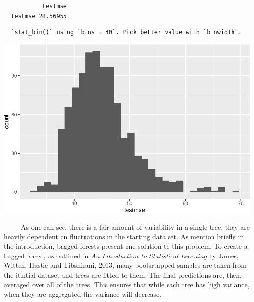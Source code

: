 \documentclass[12pt,twoside]{reedthesis}
\begin{document}
  \begin{verbatim}
           testmse
  testmse 28.56955
  \end{verbatim}
  
  \begin{Shaded}
  \begin{Highlighting}[]
  \NormalTok{(}\NormalTok{(}  \StringTok{ }\NormalTok{()}
  \end{Highlighting}
  \end{Shaded}
  
  \begin{verbatim}
  `stat_bin()` using `bins = 30`. Pick better value with `binwidth`.
  \end{verbatim}
  
  \begin{center}\includegraphics{Thesis_files/figure-latex/unnamed-chunk-2-1} \end{center}
  
  ~~~~~As one can see, there is a fair amount of variability in a single
  tree, they are heavily dependent on fluctuations in the starting data
  set. As mention briefly in the introduction, bagged forests present one
  solution to this problem. To create a bagged forest, as outlined in
  \emph{An Introduction to Statistical Learning} by James, Witten, Hastie
  and Tibshirani, 2013, many bootsrtapped samples are taken from the
  itintial dataset and trees are fitted to them. The final predictions
  are, then, averaged over all of the trees. This ensures that while each
  tree has high variance, when they are aggregated the variance will
  decrease.
  
\end{document}
